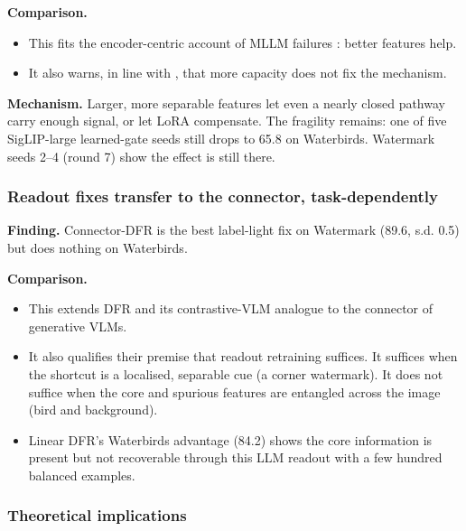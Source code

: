 \textbf{Comparison.}

\begin{itemize}
\item
  This fits the encoder-centric account of MLLM failures \cite{tong2024eyes,tong2024cambrian}: better features
  help.
\item
  It also warns, in line with \cite{sagawa2020overparam}, that more capacity does not fix the mechanism.
\end{itemize}

\textbf{Mechanism.} Larger, more separable features let even a nearly closed pathway carry enough signal, or let
LoRA compensate. The fragility remains: one of five SigLIP-large learned-gate seeds still drops to 65.8 on Waterbirds.
Watermark seeds 2--4 (round 7) show the effect is still there.

\subsubsection{Readout fixes transfer to the connector, task-dependently}

\textbf{Finding.} Connector-DFR is the best label-light fix on Watermark (89.6, s.d. 0.5) but does nothing on
Waterbirds.

\textbf{Comparison.}

\begin{itemize}
\item
  This extends DFR \cite{kirichenko2023dfr} and its contrastive-VLM analogue \cite{you2024calibrating} to the connector
  of generative VLMs.
\item
  It also qualifies their premise that readout retraining suffices. It suffices when the shortcut is a
  localised, separable cue (a corner watermark). It does not suffice when the core and spurious features are
  entangled across the image (bird and background).
\item
  Linear DFR's Waterbirds advantage (84.2) shows the core information is present but not recoverable through
  this LLM readout with a few hundred balanced examples.
\end{itemize}

\subsubsection{Theoretical implications}

